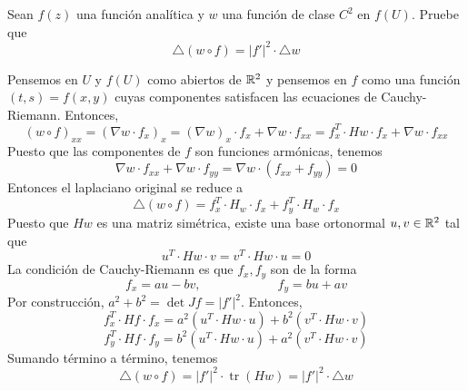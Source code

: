 \begin{exercise}
Sean $f(z)$ una función analítica y $w$ una función de clase $C^2$ en $f(U)$. Pruebe que
$$\triangle (w \circ f) = |f'|^2 \cdot \triangle w$$
\end{exercise}

\begin{solution}
Pensemos en $U$ y $f(U)$ como abiertos de $\mathbb R^2$ y pensemos en $f$ como una función $(t,s) = f(x,y)$ cuyas componentes satisfacen las ecuaciones de Cauchy-Riemann. Entonces,
$$(w \circ f)_{xx} = (\nabla w \cdot f_x)_x = (\nabla w)_x \cdot f_x + \nabla w \cdot f_{xx} = f_x^T \cdot Hw \cdot f_x + \nabla w \cdot f_{xx}$$
Puesto que las componentes de $f$ son funciones armónicas, tenemos
$$\nabla w \cdot f_{xx} + \nabla w \cdot f_{yy} = \nabla w \cdot (f_{xx} + f_{yy}) = 0$$
Entonces el laplaciano original se reduce a
$$\triangle (w \circ f) = f_x^T \cdot H_w \cdot f_x + f_y^T \cdot H_w \cdot f_x$$
Puesto que $Hw$ es una matriz simétrica, existe una base ortonormal $u, v \in \mathbb R^2$ tal que
$$u^T \cdot Hw \cdot v = v^T \cdot Hw \cdot u = 0$$
La condición de Cauchy-Riemann es que $f_x, f_y$ son de la forma
$$f_x = au - bv, \qquad \qquad \qquad f_y = bu + av$$
Por construcción, $a^2 + b^2 = \det Jf = |f'|^2$. Entonces,
$$f_x^T \cdot Hf \cdot f_x = a^2 (u^T \cdot Hw \cdot u) + b^2 (v^T \cdot Hw \cdot v)$$
$$f_y^T \cdot Hf \cdot f_y = b^2 (u^T \cdot Hw \cdot u) + a^2 (v^T \cdot Hw \cdot v)$$
Sumando término a término, tenemos
$$\triangle (w \circ f) = |f'|^2 \cdot \operatorname{tr}(Hw) = |f'|^2 \cdot \triangle w$$
\end{solution}
